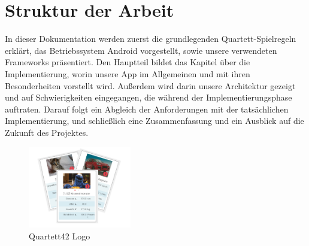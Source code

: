 \section{Struktur der Arbeit}
\label{sec:einleitung:struktur}

In dieser Dokumentation werden zuerst die grundlegenden Quartett-Spielregeln erklärt, das Betriebssystem Android vorgestellt, sowie unsere verwendeten Frameworks präsentiert. Den Hauptteil bildet das Kapitel über die Implementierung, worin unsere App im Allgemeinen und mit ihren Besonderheiten vorstellt wird. Außerdem wird darin unsere Architektur gezeigt und auf Schwierigkeiten eingegangen, die während der Implementierungsphase auftraten. Darauf folgt ein Abgleich der Anforderungen mit der tatsächlichen Implementierung, und schließlich eine Zusammenfassung und ein Ausblick auf die Zukunft des Projektes.\\

\begin{figure}[htp]
	\centering
  	\includegraphics[width=0.4\textwidth]{img/quartett42_logo.png}
	\caption{Quartett42 Logo}
	\label{figure:quartett42logo}
\end{figure}
